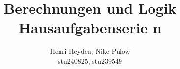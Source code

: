 \documentclass[12pt, a4paper]{article}
\title{Berechnungen und Logik\\Hausaufgabenserie n}
\author{Henri Heyden, Nike Pulow \\ \small stu240825, stu239549}
\date{}
\begin{document}
\maketitle

\doublespacing
\end{document}
